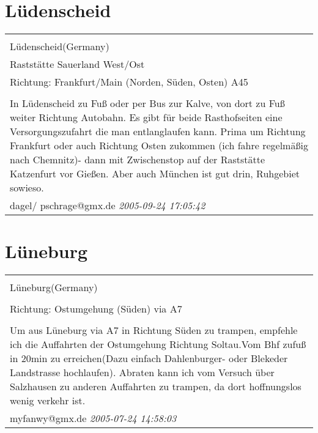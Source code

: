 \documentclass[a4paper,12pt]{article}
\begin{document}
\section{Lüdenscheid}
\begin{tabular}{|p{13cm}|}
\hline\\
Lüdenscheid(Germany)\\
Raststätte Sauerland West/Ost\\
Richtung: Frankfurt/Main (Norden, Süden, Osten) A45 \\
\hline\\
In Lüdenscheid zu Fuß oder per Bus zur Kalve, von dort zu Fuß weiter Richtung Autobahn. Es gibt für beide Rasthofseiten eine Versorgungszufahrt die man entlanglaufen kann.
Prima um Richtung Frankfurt oder auch Richtung Osten zukommen (ich fahre regelmäßig nach Chemnitz)- dann mit Zwischenstop auf der Raststätte Katzenfurt vor Gießen. Aber auch München ist gut drin, Ruhgebiet sowieso. \\
dagel/ pschrage@gmx.de \textit{ 2005-09-24 17:05:42 }\\\hline
\end{tabular}


\section{Lüneburg}
\begin{tabular}{|p{13cm}|}
\hline\\
Lüneburg(Germany)\\
\\
Richtung: Ostumgehung (Süden) via A7 \\
\hline\\
Um aus Lüneburg via A7 in Richtung Süden zu trampen, empfehle ich die Auffahrten der Ostumgehung Richtung Soltau.Vom Bhf zufuß in 20min zu erreichen(Dazu einfach Dahlenburger- oder Blekeder Landstrasse hochlaufen). Abraten kann ich vom Versuch über Salzhausen zu anderen Auffahrten zu trampen, da dort hoffnungslos wenig verkehr ist. \\
myfanwy@gmx.de \textit{ 2005-07-24 14:58:03 }\\\hline
\end{tabular}
\end{document}
